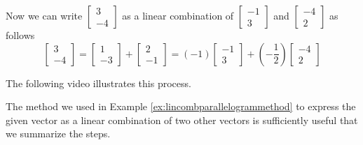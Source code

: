 \documentclass{ximera}
\begin{document}
\begin{example}
\begin{explanation}
Now we can write $\begin{bmatrix}3\\-4\end{bmatrix}$ as a linear combination of $\begin{bmatrix}-1\\3\end{bmatrix}$ and $\begin{bmatrix}-4\\2\end{bmatrix}$ as follows
 $$\begin{bmatrix}3\\-4\end{bmatrix}=\begin{bmatrix}1\\-3\end{bmatrix}+\begin{bmatrix}2\\-1\end{bmatrix}=(-1)\begin{bmatrix}-1\\3\end{bmatrix}+\left(-\frac{1}{2}\right)\begin{bmatrix}-4\\2\end{bmatrix}$$
 
The following video illustrates this process.

\end{explanation}
\end{example}

The method we used in Example \ref{ex:lincombparallelogrammethod} to express the given vector as a linear combination of two other vectors is sufficiently useful that we summarize the steps.
\end{document}
